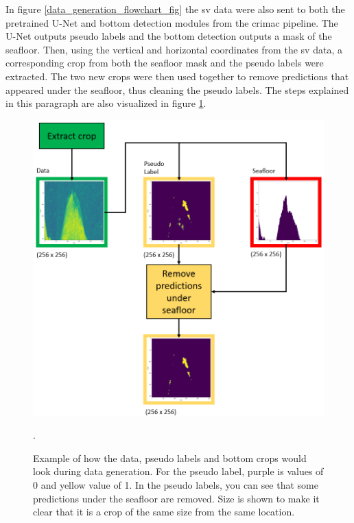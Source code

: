         In figure \ref{data_generation_flowchart_fig} the \gls{sv} data were also sent to both the pretrained U-Net and bottom detection modules from the \gls{crimac} pipeline. The U-Net outputs pseudo labels and the bottom detection outputs a mask of the seafloor. Then, using the vertical and horizontal coordinates from the \gls{sv} data, a corresponding crop from both the seafloor mask and the pseudo labels were extracted. The two new crops were then used together to remove predictions that appeared under the seafloor, thus cleaning the pseudo labels. The steps explained in this paragraph are also visualized in figure \ref{crop_extract_fig}.
        \clearpage
        \begin{figure}[H]
            \centering
            \includegraphics[scale=0.5]{figures/crop_extract_illustration.png}
            \caption[Data, label and bottom crop extraction and interaction]{Example of how the data, pseudo labels and bottom crops would look during data generation. For the pseudo label, purple is values of 0 and yellow value of 1. In the pseudo labels, you can see that some predictions under the seafloor are removed.  Size is shown to make it clear that it is a crop of the same size from the same location.}.
          	\medskip 
            \label{crop_extract_fig}
        \end{figure}
        
